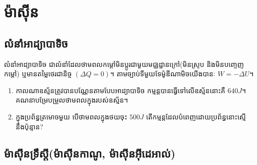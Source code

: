 \chapter{ម៉ាសុីន}
\section{លំនាំអាដ្យាបាទិច}
\begin{definition}
	លំនាំអាដ្យាបាទិច ជាលំនាំដែលថាមពលកម្តៅមិនប្តូរជាមួយមជ្ឈដ្ឋានក្រៅ(មិនស្រូប និងមិនបញ្ចេញកម្តៅ) ឬមានតម្លៃថេរជានិច្ច $\left(\Delta Q=0\right)$។ តាមច្បាប់ទីមួយទែម៉ូឌីណាមិចយើងបានៈ $W=-\Delta U$។
\end{definition}
\begin{example}
	\begin{enumerate}[m]
		\item កាលណាឧស្ម័នត្រូវបានបណ្ណែនតាមបែបអាដ្យាបាទិច កម្មន្តបានធ្វើទៅលើឧស្ម័ននោះគឺ $640J$។\\ គណនាបម្រែបម្រួលថាមពលក្នុងរបស់ឧស្ម័ន។
		\item ក្នុងប្រព័ន្ធត្រមោចមួយ បើថាមពលក្នុងថយចុះ $500J$ តើកម្មន្តដែលបំពេញដោយប្រព័ន្ធនោះស្មើនឹងប៉ុន្មាន?
	\end{enumerate}
\end{example}
\section{ម៉ាសុីនទ្រឹស្តី(ម៉ាសុីនកាណូ, ម៉ាសុីនអុីដេអាល់)}
